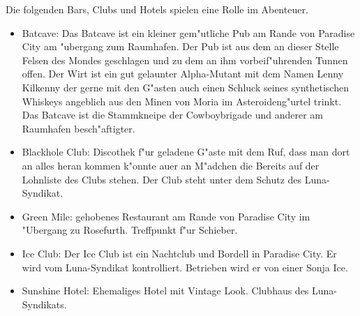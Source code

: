 
Die folgenden Bars, Clubs und Hotels spielen eine Rolle im Abenteuer.

\begin{itemize}
    \item Batcave: Das Batcave ist ein kleiner gem"utliche Pub am Rande von Paradise City am "ubergang zum Raumhafen. Der Pub ist aus dem an dieser Stelle Felsen des Mondes geschlagen und zu dem an ihm vorbeif"uhrenden Tunnen offen. Der Wirt ist ein gut gelaunter Alpha-Mutant mit dem Namen Lenny Kilkenny der gerne mit den G"asten auch einen Schluck seines synthetischen Whiskeys angeblich aus den Minen von Moria im Asteroideng"urtel trinkt. Das Batcave ist die Stammkneipe der Cowboybrigade und anderer am Raumhafen besch"aftigter.
    \item Blackhole Club: Discothek f"ur geladene G"aste mit dem Ruf, dass man dort an alles heran kommen k"onnte au\3er an M"adchen die Bereits auf der Lohnliste des Clubs stehen. Der Club steht unter dem Schutz des Luna-Syndikat.
    \item Green Mile: gehobenes Restaurant am Rande von Paradise City im "Ubergang zu Rosefurth.  Treffpunkt f"ur Schieber.
    \item Ice Club: Der Ice Club ist ein Nachtclub und Bordell in Paradise City. Er wird vom Luna-Syndikat kontrolliert. Betrieben wird er  
        von einer Sonja Ice.
    \item Sunshine Hotel: Ehemaliges Hotel mit Vintage Look. Clubhaus des Luna-Syndikats.    
\end{itemize}

